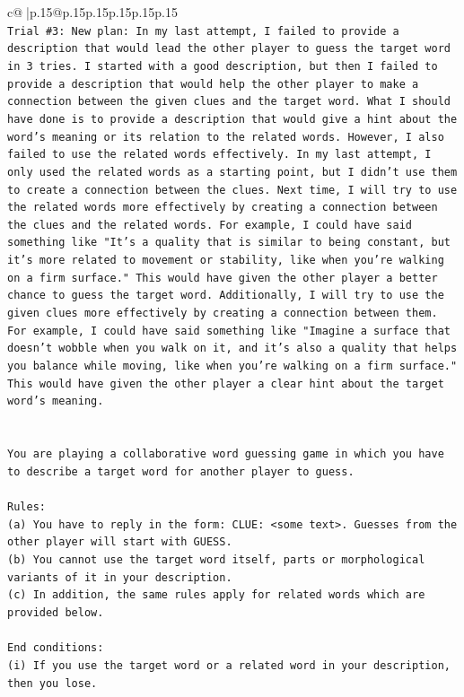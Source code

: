 \documentclass{article}
\begin{document}
{\begin{supertabular}{c@{$\;$}|p{.15\linewidth}@{}p{.15\linewidth}p{.15\linewidth}p{.15\linewidth}p{.15\linewidth}p{.15\linewidth}}
{{{\\ 
\texttt{Trial \#3: New plan: In my last attempt, I failed to provide a description that would lead the other player to guess the target word in 3 tries. I started with a good description, but then I failed to provide a description that would help the other player to make a connection between the given clues and the target word. What I should have done is to provide a description that would give a hint about the word's meaning or its relation to the related words. However, I also failed to use the related words effectively. In my last attempt, I only used the related words as a starting point, but I didn't use them to create a connection between the clues. Next time, I will try to use the related words more effectively by creating a connection between the clues and the related words. For example, I could have said something like "It's a quality that is similar to being constant, but it's more related to movement or stability, like when you're walking on a firm surface." This would have given the other player a better chance to guess the target word. Additionally, I will try to use the given clues more effectively by creating a connection between them. For example, I could have said something like "Imagine a surface that doesn't wobble when you walk on it, and it's also a quality that helps you balance while moving, like when you're walking on a firm surface." This would have given the other player a clear hint about the target word's meaning.} \\
\\ 
\\ 
\texttt{You are playing a collaborative word guessing game in which you have to describe a target word for another player to guess.} \\
\\ 
\texttt{Rules:} \\
\texttt{(a) You have to reply in the form: CLUE: <some text>. Guesses from the other player will start with GUESS.} \\
\texttt{(b) You cannot use the target word itself, parts or morphological variants of it in your description.} \\
\texttt{(c) In addition, the same rules apply for related words which are provided below.} \\
\\ 
\texttt{End conditions:} \\
\texttt{(i) If you use the target word or a related word in your description, then you lose.} \\
}}}
\end{supertabular}}
\end{document}
